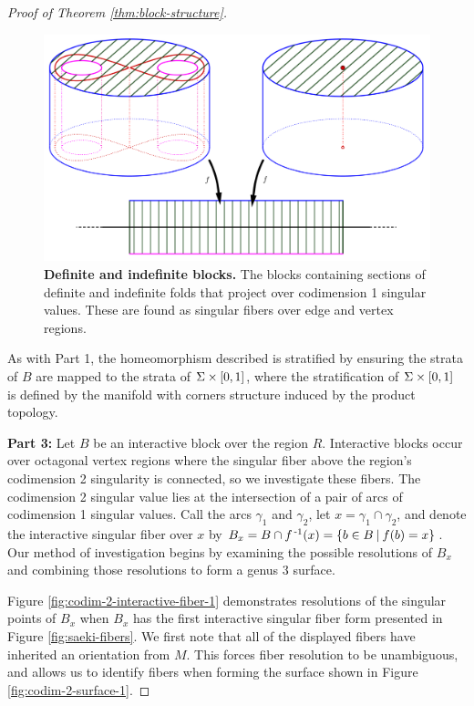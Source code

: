 \begin{proof}[Proof of Theorem \ref{thm:block-structure}]
	\begin{figure}[h!]
		\centering
		\includegraphics[width=\textwidth]{figures/codim-1-blocks.png}
		\caption{
			\textbf{Definite and indefinite blocks.}
			The blocks containing sections of definite and indefinite folds that project over codimension 1 singular values.
			These are found as singular fibers over edge and vertex regions.
		}
		\label{fig:codim-1-blocks}
	\end{figure}

	As with Part 1, the homeomorphism described is stratified by ensuring the strata of $B$ are mapped to the strata of $\Sigma \times [0,1]$, where the stratification of $\Sigma \times [0,1]$ is defined by the manifold with corners structure induced by the product topology.
	
	\textbf{Part 3:}	
	Let $B$ be an interactive block over the region $R$.
	Interactive blocks occur over octagonal vertex regions where the singular fiber above the region's codimension 2 singularity is connected, so we investigate these fibers.
	The codimension 2 singular value lies at the intersection of a pair of arcs of codimension 1 singular values.
	Call the arcs $\gamma_1$ and $\gamma_2$, let $x = \gamma_1\cap \gamma_2$, and denote the interactive singular fiber over $x$ by $B_x = B\cap f^{\,\text{-}1}(x) = \{b\in B\:|\:f(b)=x\}$.
	Our method of investigation begins by examining the possible resolutions of $B_x$ and combining those resolutions to form a genus 3 surface.
	 
	Figure \ref{fig:codim-2-interactive-fiber-1} demonstrates resolutions of the singular points of $B_x$ when $B_x$ has the first interactive singular fiber form presented in Figure \ref{fig:saeki-fibers}.
	We first note that all of the displayed fibers have inherited an orientation from $M$.
	This forces fiber resolution to be unambiguous, and allows us to identify fibers when forming the surface shown in Figure \ref{fig:codim-2-surface-1}.
	

\end{proof}
